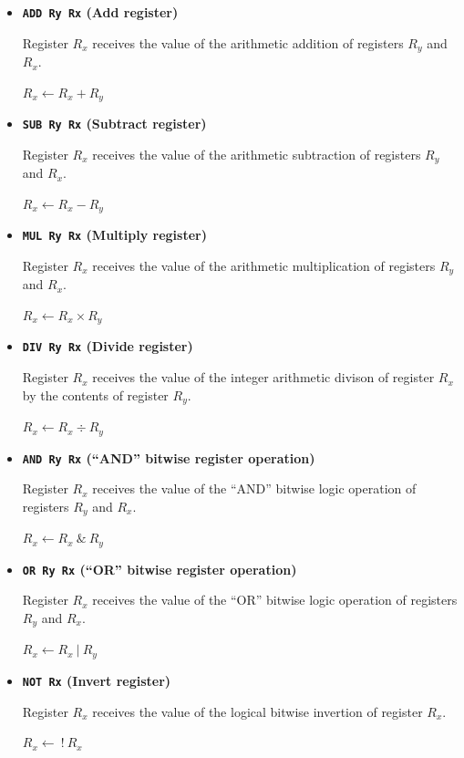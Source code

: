 \documentclass[11pt]{article}
\begin{document}
\begin{itemize}




\item \textbf{\texttt{ADD  Ry  Rx} (Add register)} 

Register $R_x$ receives the value of the arithmetic addition of registers $R_y$ and $R_x$.

$R_x \leftarrow R_x + R_y$


\item \textbf{\texttt{SUB  Ry  Rx} (Subtract register)} 

Register $R_x$ receives the value of the arithmetic subtraction of registers $R_y$ and $R_x$.

$R_x \leftarrow R_x - R_y$

\item \textbf{\texttt{MUL  Ry  Rx} (Multiply register)}

Register $R_x$ receives the value of the arithmetic multiplication of registers $R_y$ and $R_x$. 

$R_x \leftarrow R_x \times R_y$

\item \textbf{\texttt{DIV  Ry  Rx} (Divide register)} 

Register $R_x$ receives the value of the integer arithmetic divison of register $R_x$ by the contents of register $R_y$. 

$R_x \leftarrow R_x \div R_y$


\item \textbf{\texttt{AND  Ry Rx} (``AND'' bitwise register operation)} 

Register $R_x$ receives the value of the ``AND'' bitwise logic operation of registers $R_y$ and $R_x$.

$R_x \leftarrow R_x\ \&\  R_y$


\item \textbf{\texttt{OR  Ry  Rx} (``OR'' bitwise register operation)} 

Register $R_x$ receives the value of the ``OR'' bitwise logic operation of registers $R_y$ and $R_x$.

$R_x \leftarrow R_x\ |\  R_y$

\item \textbf{\texttt{NOT  Rx} (Invert register)}

Register $R_x$ receives the value of the logical bitwise invertion of register $R_x$. 

$R_x \leftarrow \ !\ R_x$

\end{itemize}
\end{document}
